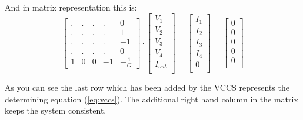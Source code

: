 And in matrix representation this is:
\begin{equation}
\label{eq:vccsStamp}
\begin{bmatrix}
.&.&.&.& 0\\
.&.&.&.& 1\\
.&.&.&.& -1\\
.&.&.&.& 0\\
1 & 0 & 0 & -1 & -\frac{1}{G}
\end{bmatrix}
\cdot
\begin{bmatrix}
V_{1}\\
V_{2}\\
V_{3}\\
V_{4}\\
I_{out}\\
\end{bmatrix}
=
\begin{bmatrix}
I_{1}\\
I_{2}\\
I_{3}\\
I_{4}\\
0\\
\end{bmatrix}
=
\begin{bmatrix}
0\\
0\\
0\\
0\\
0\\
\end{bmatrix}
\end{equation}

As you can see the last row which has been added by the VCCS
represents the determining equation (\ref{eq:vccs}).  The additional
right hand column in the matrix keeps the system consistent.

\addvspace{12pt}

